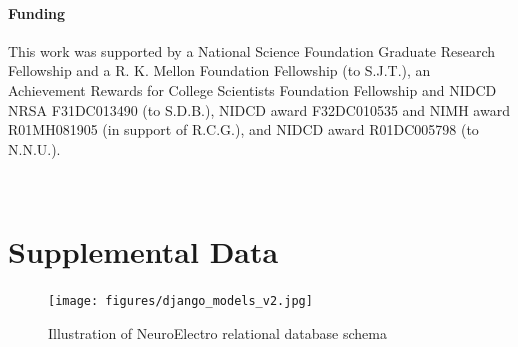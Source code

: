 \documentclass{template/frontiersSCNS} %
\begin{document}
\paragraph{Funding\textcolon} This work was supported by a National Science Foundation Graduate Research Fellowship and a R. K. Mellon Foundation Fellowship (to S.J.T.), an Achievement Rewards for College Scientists Foundation Fellowship and NIDCD NRSA F31DC013490 (to S.D.B.), NIDCD award F32DC010535 and NIMH award R01MH081905 (in support of R.C.G.), and NIDCD award R01DC005798 (to N.N.U.).


\
\section*{Supplemental Data}  
\begin{figure}[htbp]
\centering
\texttt{[image: figures/django\_models\_v2.jpg]}
\caption{Illustration of NeuroElectro relational database schema}
\label{db_schema}
\end{figure}
\end{document}
